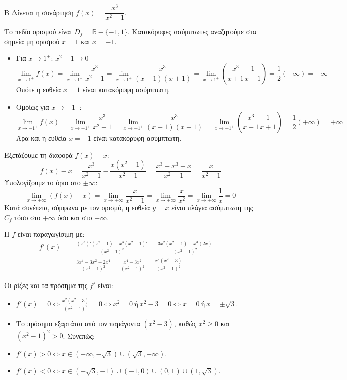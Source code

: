 \begin{thema}{Β}
Δίνεται η συνάρτηση $f(x) = \dfrac{x^3}{x^2-1}$.

\begin{erwthma}
\item Το πεδίο ορισμού είναι $D_f = \mathbb{R} - \{-1, 1\}$.
Κατακόρυφες ασύμπτωτες αναζητούμε στα σημεία μη ορισμού $x=1$ και $x=-1$.
\begin{itemize}
\item Για $x \to 1^+$: $x^2-1 \to 0$
\[\lim\limits_{x\to1^+}{f(x)}=\lim\limits_{x\to1^+}{\frac{x^3}{x^2-1}}=\lim\limits_{x\to1^+}{\frac{x^3}{(x-1)(x+1)}}=\lim\limits_{x\to 1^+}{\left(\frac{x^3}{x+1}\frac{1}{x-1}\right)}=\frac{1}{2}(+\infty)=+\infty\]
Οπότε η ευθεία $x = 1$ είναι κατακόρυφη ασύμπτωτη.
\item Ομοίως για $x \to -1^+$: 
\[\lim\limits_{x\to-1^+}{f(x)}=\lim\limits_{x\to-1^+}{\frac{x^3}{x^2-1}}=\lim\limits_{x\to-1^+}{\frac{x^3}{(x-1)(x+1)}}=\lim\limits_{x\to -1^+}{\left(\frac{x^3}{x-1}\frac{1}{x+1}\right)}=\frac{1}{2}(+\infty)=+\infty\]
Άρα και η ευθεία $x = -1$ είναι κατακόρυφη ασύμπτωτη.
\end{itemize}


\item Εξετάζουμε τη διαφορά $f(x) - x$:
\[ f(x) - x = \frac{x^3}{x^2-1} - \frac{x(x^2-1)}{x^2-1} = \frac{x^3 - x^3 + x}{x^2-1} = \frac{x}{x^2-1} \]
Υπολογίζουμε το όριο στο $\pm\infty$:
\[ \lim_{x\to \pm\infty} (f(x) - x) = \lim_{x\to \pm\infty} \frac{x}{x^2-1} = \lim_{x\to \pm\infty} \frac{x}{x^2} = \lim_{x\to \pm\infty} \frac{1}{x} = 0 \]
Κατά συνέπεια, σύμφωνα με τον ορισμό, η ευθεία $y = x$ είναι πλάγια ασύμπτωτη της $C_f$ τόσο στο $+\infty$ όσο και στο $-\infty$.

\item Η $f$ είναι παραγωγίσιμη με:
\begin{align*}
f'(x) &= \frac{(x^3)'(x^2-1) - x^3(x^2-1)'}{(x^2-1)^2} = \frac{3x^2(x^2-1) - x^3(2x)}{(x^2-1)^2} =\\&= \frac{3x^4 - 3x^2 - 2x^4}{(x^2-1)^2} = \frac{x^4 - 3x^2}{(x^2-1)^2} = \frac{x^2(x^2-3)}{(x^2-1)^2}
\end{align*}

Οι ρίζες και τα πρόσημα της $f'$ είναι:
\begin{itemize}
\item $f'(x)=0\Leftrightarrow\frac{x^2(x^2-3)}{(x^2-1)^2}=0\Leftrightarrow x^2=0\ \text{ή}\ x^2-3=0\Leftrightarrow x=0\ \text{ή}\  x=\pm\sqrt{3}$.
\item Το πρόσημο εξαρτάται από τον παράγοντα $(x^2-3)$, καθώς $x^2 \ge 0$ και $(x^2-1)^2 > 0$. Συνεπώς:
\item $f'(x) > 0 \Leftrightarrow x \in (-\infty, -\sqrt{3}) \cup (\sqrt{3}, +\infty)$.
\item $f'(x) < 0 \Leftrightarrow x \in (-\sqrt{3}, -1) \cup (-1, 0) \cup (0, 1) \cup (1, \sqrt{3})$.
\end{itemize}


\end{erwthma}
\end{thema}
